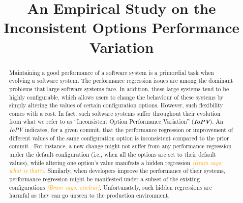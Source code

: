 \documentclass[smallextended]{svjour3}       %
\newcommand{\inconsistent}{{\em IoPV}\xspace}
\newcommand{\bram}[1]{\textcolor{orange}{{\it [Bram says: #1]}}}
\begin{document}
\title{An Empirical Study on the Inconsistent Options Performance Variation}

\newcommand{\PQI}{How common are \inconsistent issues? }
\newcommand{\PQII}{How difficult is it to manually identify \inconsistent issues?}

\newcommand{\RQI}{What is the impact of configuration on performance regression?}
\newcommand{\RQII}{How accurately can we predict \inconsistent issues? }
\newcommand{\RQIII}{What are the most important metrics for predicting \inconsistent issues? }

\author{
}

\maketitle
\begin{abstract}
Maintaining a good performance of a software system is a primordial task when evolving a software system. The performance regression issues are among the dominant problems that large software systems face. In addition, these large systems tend to be highly configurable, which allows users to change the behaviour of these systems by simply altering the values of certain configuration options. However, such flexibility comes with a cost. In fact, such software systems suffer throughout their evolution from what we refer to as ``Inconsistent Option Performance Variation'' (\textbf{\inconsistent}). An \inconsistent indicates, for a given commit, that the performance regression or improvement of different values of the same configuration option is inconsistent compared to the prior commit%
. For instance, a new change might not suffer from any performance regression under the default configuration (i.e., when all the options are set to their default values), while altering one option's value manifests a hidden regression \bram{what is that?}. Similarly, when developers improve the performance of their systems, performance regression might be manifested under a subset of the existing configurations \bram{unclear}. Unfortunately, such hidden regressions are harmful as they can go unseen to the production environment. %

\end{abstract}
\end{document}
